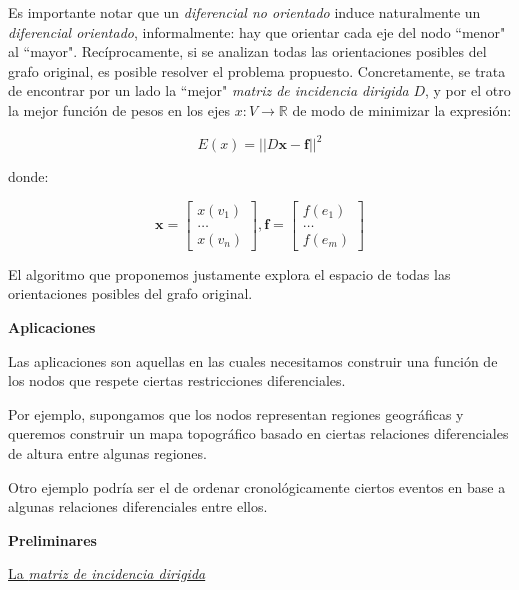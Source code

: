 \documentclass[a4paper,11pt]{article}
\begin{document}
\bigskip

Es importante notar que un \textit{diferencial no orientado} induce 
naturalmente un \textit{diferencial orientado}, informalmente: hay que 
orientar cada eje del nodo ``menor" al ``mayor". Recíprocamente, si
se analizan todas las orientaciones posibles del grafo original, es 
posible resolver el problema propuesto. Concretamente, se trata de 
encontrar por un lado la ``mejor" \textit{matriz de incidencia 
dirigida} $D$, y por el otro la mejor función de pesos en 
los ejes $x: V \rightarrow \mathbb{R}$ de modo de minimizar la 
expresión:

$$E(x) = ||D\bm{x}-\bm{f}||^2$$

donde:

$$
\bm{x} = 
\begin{bmatrix}
	x(v_1)\\
	\dots \\
	x(v_n)
\end{bmatrix}, 
\bm{f} = 
\begin{bmatrix}
	f(e_1)\\
	\dots \\
	f(e_m)
\end{bmatrix}
$$

\bigskip

El algoritmo que proponemos justamente explora el espacio de todas las 
orientaciones posibles del grafo original.

\bigskip

\newpage

\textbf{Aplicaciones}

\bigskip

Las aplicaciones son aquellas en las cuales necesitamos construir una 
función de los nodos que respete ciertas restricciones diferenciales.

\bigskip

Por ejemplo, supongamos que los nodos representan regiones geográficas 
y queremos construir un mapa topográfico basado en ciertas relaciones 
diferenciales de altura entre algunas regiones.

\bigskip

Otro ejemplo podría ser el de ordenar cronológicamente ciertos eventos 
en base a algunas relaciones diferenciales entre ellos.

\bigskip

\textbf{Preliminares}

\bigskip

\underline{La \textit{matriz de incidencia dirigida}}
\end{document}

